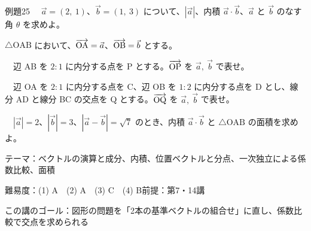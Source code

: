\documentclass[paper=b5j, fontsize=8pt, fleqn, twoside]{jlreq}
\begin{document}
\begin{ascolorbox4A}[出典：オリジナル]{例題25}
  　$\vec a=(2,\ 1)$、$\vec b=(1,\ 3)$ について、$|\vec a|$、内積 $\vec a\cdot\vec b$、$\vec a$ と $\vec b$ のなす角 $\theta$ を求めよ。\par
  $\triangle\mathrm{OAB}$ において、$\overrightarrow{\mathrm{OA}}=\vec a$、$\overrightarrow{\mathrm{OB}}=\vec b$ とする。\par
  　辺 AB を $2:1$ に内分する点を P とする。$\overrightarrow{\mathrm{OP}}$ を $\vec a,\ \vec b$ で表せ。\par
  　辺 OA を $2:1$ に内分する点を C、辺 OB を $1:2$ に内分する点を D とし、線分 AD と線分 BC の交点を Q とする。$\overrightarrow{\mathrm{OQ}}$ を $\vec a,\ \vec b$ で表せ。\par
  　$|\vec a|=2$、$|\vec b|=3$、$|\vec a-\vec b|=\sqrt7$ のとき、内積 $\vec a\cdot\vec b$ と $\triangle\mathrm{OAB}$ の面積を求めよ。
\end{ascolorbox4A}

\begin{Data}
  テーマ：ベクトルの演算と成分、内積、位置ベクトルと分点、一次独立による係数比較、面積\par
  難易度：(1) A　(2) A　(3) C　(4) B\quad 前提：第7・14講\par
  この講のゴール：図形の問題を「2本の基準ベクトルの組合せ」に直し、係数比較で交点を求められる
\end{Data}
\end{document}
